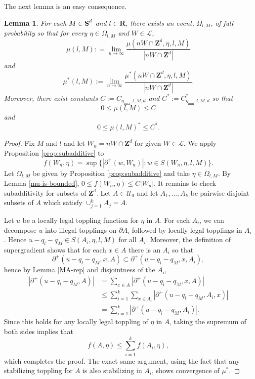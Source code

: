 \documentclass[12pt]{amsart}
\newcommand{\R}{\mathbf{R}}
\newcommand{\Z}{\mathbf{Z}}
\newcommand{\symm}{{\mbox{\bf S}}}  %
\newtheorem{lemma}[theorem]{Lemma}
\begin{document}
The next lemma is an easy consequence.







\begin{lemma} \label{sub-additive-ergodic}
For each $M \in \symm^d$ and $l \in \R$, there exists an event, $\Omega_{l,M}$, of full probability so that 
for every $\eta \in \Omega_{l,M}$ and $W \in \mathcal{L}$, 
\[
\mu(l, M): = \lim_{n \to \infty} \frac{\mu(n W \cap \Z^d, \eta, l, M) }{|n W \cap \Z^d|}
\]
and
\[
\mu^*(l,M) := \lim_{n \to \infty} \frac{\mu^*(n W \cap \Z^d , \eta, l, M) }{|n W \cap \Z^d|}.
\]
Moreover, there exist constants $C:=C_{\eta_{\max},l,M,d}$ and $C^*:=C^*_{\eta_{\min},l,M,d}$ so that
\[
0 \leq \mu(l,M) \leq C
\]
and
\[
0 \leq \mu(l,M)^* \leq C^*.
\]


\end{lemma}

\begin{proof}
Fix $M$ and $l$ and let $W_n = n W \cap \Z^d$ for given $W \in \mathcal{L}$. We apply Proposition \ref{prop:subadditive} to
\[
f(W_n, \eta) = \sup\{ |\partial^+(w, W_n)| : w \in S(W_n, \eta, l, M)\}. 
\]
Let $\Omega_{l,M}$ be given by Proposition \ref{prop:subadditive} and take $\eta \in \Omega_{l,M}$. 
By Lemma \ref{mu-is-bounded}, $0 \leq f(W_n, \eta) \leq  C |W_n|$.  It remains to check subadditivity for subsets of $\Z^d$.  
Let $A \in \mathcal{U}_0$  and let $A_1, \ldots, A_k$ be pairwise disjoint subsets of $A$ which satisfy $\cup_{j=1}^k A_j = A$. 


Let $u$ be a locally legal toppling function for $\eta$ in $A$. For each $A_i$, we can decompose $u$ into illegal topplings on $\partial A_i$ followed by locally legal topplings 
in $A_i$. Hence $u - q_l - q_M \in S(A_i, \eta, l,M)$ for all $A_i$. Moreover, the definition of supergradient
shows that for each $x \in A$ there is an $A_i$ so that
\[
\partial^+(u-q_l-q_M, x, A) \subset \partial^+(u - q_l-q_M, x, A_i),
\]
hence by Lemma \ref{MA-rep} and disjointness of the $A_i$, 
\begin{align*}
|\partial^+(u-q_l-q_M, A)| &= \sum_{x \in A} |\partial^+(u-q_l-q_M, x, A)|  \\
&\leq  \sum_{i=1}^k \sum_{x \in A_i} |\partial^+(u - q_l-q_M, A_i, x)| \\
&= \sum_{i=1}^k  |\partial^+(u - q_l-q_M, A_i)|. 
\end{align*}
Since this holds for any locally legal toppling of $\eta$ in $A$, taking the supremum of both sides implies that 
\[
f(A, \eta) \leq \sum_{i=1}^k f(A_i, \eta), 
\]
which completes the proof. The exact same argument, using the fact that any stabilizing toppling for $A$ is also stabilizing in $A_i$, shows convergence of $\mu^*$.
\end{proof}
\end{document}
